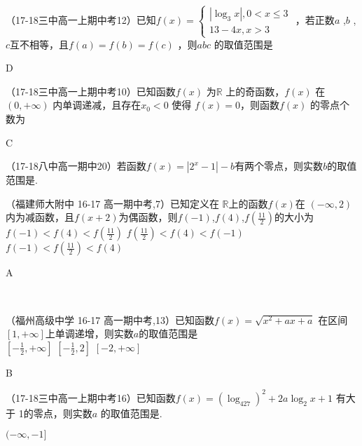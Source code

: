 \item
（17-18三中高一上期中考12）已知$f(x)=\begin{cases}
 |\log_3x|,0<x\leq3\\13-4x,x>3   
\end{cases} $ ，若正数$a$ ,$b$ , $c$互不相等，且$f(a)=f(b)=f(c)$ ，则$abc$ 的取值范围是\xz
{}
\begin{answer}
D
\end{answer}

\item
（17-18三中高一上期中考10）已知函数$f(x)$ 为$\mathbb{R}$ 上的奇函数，$f(x)$ 在$(0,+\infty)$ 内单调递减，且存在$x_0<0$ 使得 $f(x)=0$，则函数$f(x)$ 的零点个数为\xz\\
\begin{answer}
C
\end{answer}
\item
（17-18八中高一期中20）若函数$f(x)=|2^x-1|-b $有两个零点，则实数$b$的取值范围是\tk.\\


\item（福建师大附中 16-17 高一期中考,7）已知定义在 $\mathbb{R}$上的函数$f(x)$在 $(-\infty,2)$内为减函数，且$f(x+2) $为偶函数，则$f(-1)$,$f(4)$,$f(\frac{11}2 )$的大小为\xz \\
	   {$f(-1)<f(4)<f(\frac{11}2 )$}
       {$f(\frac{11}2 )<f(4)<f(-1)$}
       {$f(-1)<f(\frac{11}2 )<f(4)$}
\begin{answer}A\end{answer}\\
     
\item
（福州高级中学 16-17 高一期中考,13）已知函数$f(x)=\sqrt{x^2+ax+a} $ 在区间$[1,+\infty] $上单调递增，则实数$a$的取值范围是\xz\\
\xx{$[-2,-\frac12]$}
		{$[-\frac12,+\infty] $}
        {$[-\frac12,2] $}
        {$[-2,+\infty] $}
\begin{answer}B\end{answer}

\item
（17-18三中高一上期中考16）已知函数$f(x)=(\log_427)^2+2a\log_2x+1 $ 有大于 1的零点，则实数$a$ 的取值范围是\tk.
\begin{answer}
$(-\infty,-1]$
\end{answer}


